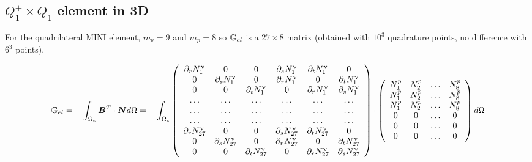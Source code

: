 \subsection{$Q_1^+\times Q_1$ element in 3D}



For the quadrilateral MINI element, $m_\upnu=9$ and $m_p=8$ so ${\mathbb{G}}_{el}$ is
a $27\times 8$ matrix (obtained with $10^3$ quadrature points, no difference
with $6^3$ points).

\[
{\mathbb{G}}_{el} = -\int_{\Omega_e} {\bm B}^T \cdot {\bm N} d\Omega
= -\int_{\Omega_e}
\left(
\begin{array}{cccccc}
\partial_r N_1^\upnu & 0 & 0 & \partial_s N_1^\upnu  & \partial_t N_1^\upnu & 0 \\
0 & \partial_s N_1^\upnu  & 0 & \partial_r N_1^\upnu  & 0 & \partial_t N_1^\upnu \\
0 & 0 & \partial_t N_1^\upnu  & 0 & \partial_r N_1^\upnu  & \partial_s N_1^\upnu \\
\dots  & \dots & \dots  & \dots & \dots  & \dots \\
\dots  & \dots & \dots  & \dots & \dots  & \dots \\
\dots  & \dots & \dots  & \dots & \dots  & \dots \\
\partial_r N_{27}^\upnu & 0 & 0 & \partial_s N_{27}^\upnu  & \partial_t N_{27}^\upnu & 0 \\
0 & \partial_s N_{27}^\upnu  & 0 & \partial_r N_{27}^\upnu  & 0 & \partial_t N_{27}^\upnu \\
0 & 0 & \partial_t N_{27}^\upnu  & 0 & \partial_r N_{27}^\upnu  & \partial_s N_{27}^\upnu 
\end{array}
\right)
\cdot
\left(
\begin{array}{cccc}
N_1^p & N_2^p & \dots & N_{8}^p \\ 
N_1^p & N_2^p & \dots & N_{8}^p \\ 
N_1^p & N_2^p & \dots & N_{8}^p \\ 
0 & 0 & \dots & 0 \\ 
0 & 0 & \dots & 0 \\ 
0 & 0 & \dots & 0 
\end{array}
\right)
d\Omega
\]


